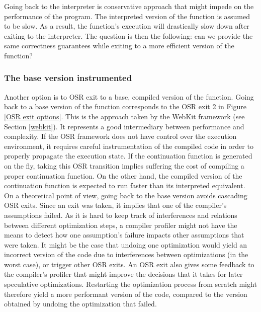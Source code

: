 Going back to the interpreter is conservative approach that might impede on the performance of the program.
The interpreted version of the function is assumed to be slow.
As a result, the function's execution will drastically slow down after exiting to the interpreter.
The question is then the following: can we provide the same correctness guarantees while exiting to a more efficient version of the function?\\

\subsubsection{The base version instrumented}
Another option is to OSR exit to a base, compiled version of the function.
Going back to a base version of the function corresponds to the OSR exit 2 in Figure \ref{OSR exit options}.
This is the approach taken by the WebKit framework (see Section \ref{webkit}).
It represents a good intermediary between performance and complexity.
If the OSR framework does not have control over the execution environment, it requires careful instrumentation of the compiled code in order to properly propagate the execution state.
If the continuation function is generated on the fly, taking this OSR transition implies suffering the cost of compiling a proper continuation function.
On the other hand, the compiled version of the continuation function is expected to run faster than its interpreted equivalent.\\

On a theoretical point of view, going back to the base version avoids cascading OSR exits.
Since an exit was taken, it implies that one of the compiler's assumptions failed.
As it is hard to keep track of interferences and relations between different optimization steps, a compiler profiler might not have the means to detect how one assumption's failure impacts other assumptions that were taken.
It might be the case that undoing one optimization would yield an incorrect version of the code due to interferences between optimizations (in the worst case), or trigger other OSR exits.
An OSR exit also gives some feedback to the compiler's profiler that might improve the decisions that it takes for later speculative optimizations.
Restarting the optimization process from scratch might therefore yield a more performant version of the code, compared to the version obtained by undoing the optimization that failed.\\

